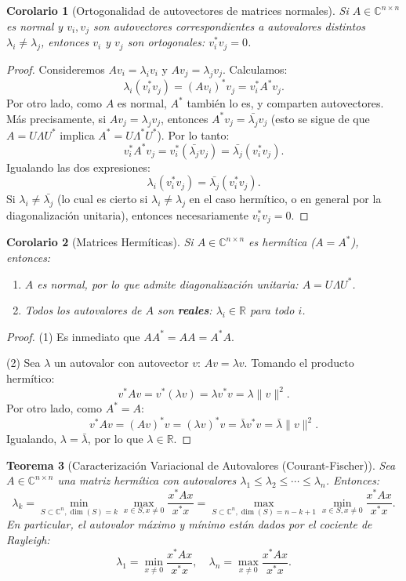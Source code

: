 \documentclass[a4paper,11pt]{report}
\newtheorem{theorem}{Teorema}[chapter]
\newtheorem{corollary}[theorem]{Corolario}
\begin{document}
\begin{corollary}[Ortogonalidad de autovectores de matrices normales]
Si $A \in \mathbb{C}^{n \times n}$ es normal y $v_i, v_j$ son autovectores correspondientes a autovalores distintos $\lambda_i \neq \lambda_j$, entonces $v_i$ y $v_j$ son ortogonales: $v_i^* v_j = 0$.
\end{corollary}

\begin{proof}
Consideremos $Av_i = \lambda_i v_i$ y $Av_j = \lambda_j v_j$.
Calculamos:
\[
\lambda_i (v_i^* v_j) = (Av_i)^* v_j = v_i^* A^* v_j.
\]
Por otro lado, como $A$ es normal, $A^*$ también lo es, y comparten autovectores. Más precisamente, si $Av_j = \lambda_j v_j$, entonces $A^* v_j = \bar{\lambda_j} v_j$ (esto se sigue de que $A = U \Lambda U^*$ implica $A^* = U \Lambda^* U^*$). Por lo tanto:
\[
v_i^* A^* v_j = v_i^* (\bar{\lambda_j} v_j) = \bar{\lambda_j} (v_i^* v_j).
\]
Igualando las dos expresiones:
\[
\lambda_i (v_i^* v_j) = \bar{\lambda_j} (v_i^* v_j).
\]
Si $\lambda_i \neq \bar{\lambda_j}$ (lo cual es cierto si $\lambda_i \neq \lambda_j$ en el caso hermítico, o en general por la diagonalización unitaria), entonces necesariamente $v_i^* v_j = 0$.
\end{proof}

\begin{corollary}[Matrices Hermíticas]
Si $A \in \mathbb{C}^{n \times n}$ es hermítica ($A = A^*$), entonces:
\begin{enumerate}
    \item $A$ es normal, por lo que admite diagonalización unitaria: $A = U \Lambda U^*$.
    \item Todos los autovalores de $A$ son \textbf{reales}: $\lambda_i \in \mathbb{R}$ para todo $i$.
\end{enumerate}
\end{corollary}

\begin{proof}
(1) Es inmediato que $A A^* = A A = A^* A$.

(2) Sea $\lambda$ un autovalor con autovector $v$: $Av = \lambda v$. Tomando el producto hermítico:
\[
v^* A v = v^* (\lambda v) = \lambda v^* v = \lambda \|v\|^2.
\]
Por otro lado, como $A^* = A$:
\[
v^* A v = (A v)^* v = (\lambda v)^* v = \bar{\lambda} v^* v = \bar{\lambda} \|v\|^2.
\]
Igualando, $\lambda = \bar{\lambda}$, por lo que $\lambda \in \mathbb{R}$.
\end{proof}


\begin{theorem}[Caracterización Variacional de Autovalores (Courant-Fischer)]
Sea $A \in \mathbb{C}^{n \times n}$ una matriz hermítica con autovalores $\lambda_1 \leq \lambda_2 \leq \cdots \leq \lambda_n$. Entonces:
\[
\lambda_k = \min_{S \subset \mathbb{C}^n, \dim(S)=k} \max_{x \in S, x \neq 0} \frac{x^* A x}{x^* x} = \max_{S \subset \mathbb{C}^n, \dim(S)=n-k+1} \min_{x \in S, x \neq 0} \frac{x^* A x}{x^* x}.
\]
En particular, el autovalor máximo y mínimo están dados por el cociente de Rayleigh:
\[
\lambda_1 = \min_{x \neq 0} \frac{x^* A x}{x^* x}, \quad \lambda_n = \max_{x \neq 0} \frac{x^* A x}{x^* x}.
\]
\end{theorem}
\end{document}
